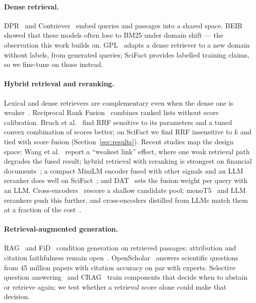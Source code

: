 \documentclass[runningheads]{llncs}
\begin{document}
\paragraph{Dense retrieval.} DPR~\cite{karpukhin2020dpr} and
Contriever~\cite{izacard2022contriever} embed queries and passages into a shared
space. BEIR~\cite{thakur2021beir} showed that these models often lose to BM25 under
domain shift --- the observation this work builds on. GPL~\cite{wang2022gpl} adapts
a dense retriever to a new domain without labels, from generated queries; SciFact
provides labelled training claims, so we fine-tune on those instead.

\paragraph{Hybrid retrieval and reranking.} Lexical and dense retrievers are
complementary even when the dense one is weaker~\cite{chen2022hybrid}. Reciprocal
Rank Fusion~\cite{cormack2009rrf} combines ranked lists without score
calibration. Bruch et al.~\cite{bruch2024fusion} find RRF sensitive to its
parameters and a tuned convex combination of scores better; on SciFact we find
RRF insensitive to $k$ and tied with score fusion (Section~\ref{sec:results}).
Recent studies map the design space: Wang et al.~\cite{wang2026blend} report a
``weakest link'' effect, where one weak retrieval path degrades the fused result;
hybrid retrieval with reranking is strongest on financial
documents~\cite{akarsu2026bm25}; a compact MiniLM encoder fused with other
signals and an LLM reranker does well on SciFact~\cite{rao2025rethinking}; and
DAT~\cite{hsu2025dat} sets the fusion weight per query with an LLM.
Cross-encoders~\cite{nogueira2019passage} rescore a shallow candidate pool;
monoT5~\cite{nogueira2020document} and LLM rerankers push this further, and
cross-encoders distilled from LLMs match them at a fraction of the
cost~\cite{schlatt2025rankdistillm}.

\paragraph{Retrieval-augmented generation.} RAG~\cite{lewis2020rag} and
FiD~\cite{izacard2021fid} condition generation on retrieved passages; attribution
and citation faithfulness remain open~\cite{gao2023enabling}.
OpenScholar~\cite{asai2026openscholar} answers scientific questions from 45 million
papers with citation accuracy on par with experts. Selective question
answering~\cite{kamath2020selective} and CRAG~\cite{yan2024crag} train components
that decide when to abstain or retrieve again; we test whether a retrieval score
alone could make that decision.
\end{document}
